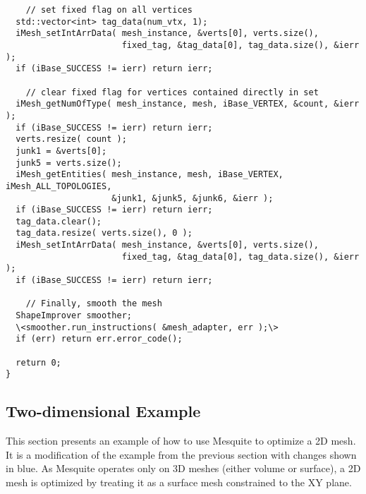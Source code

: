 \begin{lstlisting}
    // set fixed flag on all vertices
  std::vector<int> tag_data(num_vtx, 1);
  iMesh_setIntArrData( mesh_instance, &verts[0], verts.size(), 
                       fixed_tag, &tag_data[0], tag_data.size(), &ierr );
  if (iBase_SUCCESS != ierr) return ierr;

    // clear fixed flag for vertices contained directly in set
  iMesh_getNumOfType( mesh_instance, mesh, iBase_VERTEX, &count, &ierr );
  if (iBase_SUCCESS != ierr) return ierr;
  verts.resize( count );
  junk1 = &verts[0];
  junk5 = verts.size();
  iMesh_getEntities( mesh_instance, mesh, iBase_VERTEX, iMesh_ALL_TOPOLOGIES,
                     &junk1, &junk5, &junk6, &ierr );
  if (iBase_SUCCESS != ierr) return ierr;
  tag_data.clear();
  tag_data.resize( verts.size(), 0 );
  iMesh_setIntArrData( mesh_instance, &verts[0], verts.size(), 
                       fixed_tag, &tag_data[0], tag_data.size(), &ierr );
  if (iBase_SUCCESS != ierr) return ierr;

    // Finally, smooth the mesh
  ShapeImprover smoother;
  \<smoother.run_instructions( &mesh_adapter, err );\>
  if (err) return err.error_code();

  return 0;
}
\end{lstlisting}

\subsection{Two-dimensional Example}

This section presents an example of how to use Mesquite to optimize a 2D mesh.  It is a modification of the example from the previous section with changes shown in blue.  As Mesquite operates only on 3D meshes (either volume or surface), a 2D mesh is optimized by treating it as a surface mesh constrained to the XY plane.


